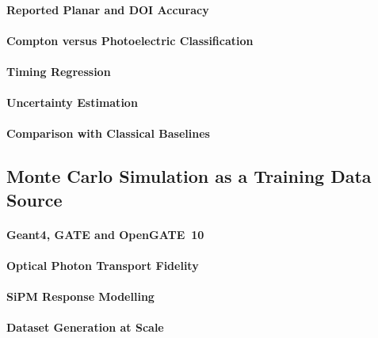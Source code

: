 \paragraph{Reported Planar and DOI Accuracy}

\paragraph{Compton versus Photoelectric Classification}

\paragraph{Timing Regression}

\paragraph{Uncertainty Estimation}

\paragraph{Comparison with Classical Baselines}

\subsection{Monte Carlo Simulation as a Training Data Source}
\label{sec:monte-carlo}

\paragraph{Geant4, GATE and OpenGATE~10}

\paragraph{Optical Photon Transport Fidelity}

\paragraph{SiPM Response Modelling}

\paragraph{Dataset Generation at Scale}

